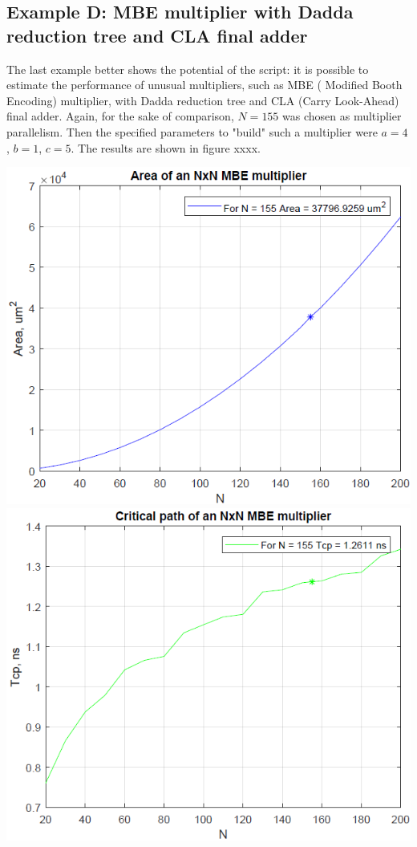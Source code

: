 \documentclass[11pt]{article} %
\begin{document}
\subsection{Example D: MBE multiplier with Dadda reduction tree and CLA final adder}
The last example better shows the potential of the script: it is possible to estimate the performance of unusual multipliers, such as MBE ( Modified Booth Encoding) multiplier, with Dadda reduction tree and CLA (Carry Look-Ahead) final adder. Again, for the sake of comparison, $N = 155$ was chosen as multiplier parallelism. Then the specified parameters to "build" such a multiplier were $a=4$, $b=1$, $c=5$. The results are shown in figure xxxx.
\vspace{1em}
\begin{center}
\includegraphics[scale=.48]{area_mbe.PNG}
\includegraphics[scale=.48]{tcp_mbe.PNG}\\

\end{center}
\end{document}
